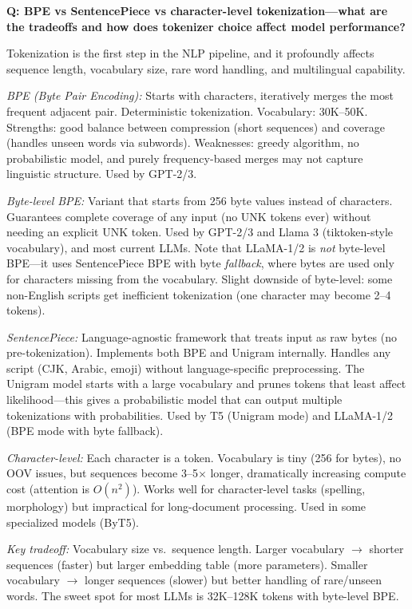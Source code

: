 \begin{interviewq}
\textbf{Q: BPE vs SentencePiece vs character-level tokenization---what are the tradeoffs and how does tokenizer choice affect model performance?}

 \quad {} \quad \badgefreq{\freqmed}

\stronganswer Tokenization is the first step in the NLP pipeline, and it profoundly affects sequence length, vocabulary size, rare word handling, and multilingual capability.

\textit{BPE (Byte Pair Encoding):} Starts with characters, iteratively merges the most frequent adjacent pair. Deterministic tokenization. Vocabulary: 30K--50K. Strengths: good balance between compression (short sequences) and coverage (handles unseen words via subwords). Weaknesses: greedy algorithm, no probabilistic model, and purely frequency-based merges may not capture linguistic structure. Used by GPT-2/3.

\textit{Byte-level BPE:} Variant that starts from 256 byte values instead of characters. Guarantees complete coverage of any input (no UNK tokens ever) without needing an explicit UNK token. Used by GPT-2/3 and Llama 3 (tiktoken-style vocabulary), and most current LLMs. Note that LLaMA-1/2 is \emph{not} byte-level BPE---it uses SentencePiece BPE with byte \emph{fallback}, where bytes are used only for characters missing from the vocabulary. Slight downside of byte-level: some non-English scripts get inefficient tokenization (one character may become 2--4 tokens).

\textit{SentencePiece:} Language-agnostic framework that treats input as raw bytes (no pre-tokenization). Implements both BPE and Unigram internally. Handles any script (CJK, Arabic, emoji) without language-specific preprocessing. The Unigram model starts with a large vocabulary and prunes tokens that least affect likelihood---this gives a probabilistic model that can output multiple tokenizations with probabilities. Used by T5 (Unigram mode) and LLaMA-1/2 (BPE mode with byte fallback).

\textit{Character-level:} Each character is a token. Vocabulary is tiny (256 for bytes), no OOV issues, but sequences become 3--5$\times$ longer, dramatically increasing compute cost (attention is $O(n^2)$). Works well for character-level tasks (spelling, morphology) but impractical for long-document processing. Used in some specialized models (ByT5).

\textit{Key tradeoff:} Vocabulary size vs.\ sequence length. Larger vocabulary $\to$ shorter sequences (faster) but larger embedding table (more parameters). Smaller vocabulary $\to$ longer sequences (slower) but better handling of rare/unseen words. The sweet spot for most LLMs is 32K--128K tokens with byte-level BPE.


\end{interviewq}
